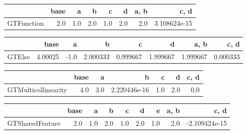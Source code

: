     \begin{tabular}{lrrrrrrr}
    \toprule
    {} &  base &    a &    b &    c &    d &  a, b &          c, d \\
    \midrule
    GTFunction &   2.0 &  1.0 &  2.0 &  1.0 &  2.0 &   2.0 &  3.108624e-15 \\
    \bottomrule
    \end{tabular}
    
    \begin{tabular}{lrrrrrrr}
    \toprule
    {} &     base &    a &         b &         c &         d &      a, b &      c, d \\
    \midrule
    GTElse &  4.00025 & -1.0 &  2.000333 &  0.999667 &  1.999667 &  1.999667 &  0.000333 \\
    \bottomrule
    \end{tabular}
    
    \begin{tabular}{lrrrrrr}
        \toprule
        {} &  base &    a &             b &    c &    d &  c, d \\
        \midrule
        GTMulticollinearity &   4.0 &  3.0 &  2.220446e-16 &  1.0 &  2.0 &   0.0 \\
        \bottomrule
        \end{tabular}

        \begin{tabular}{lrrrrrrrr}
            \toprule
            {} &  base &    a &    b &    c &    d &    e &  a, b &          c, d \\
            \midrule
            GTSharedFeature &   2.0 &  1.0 &  2.0 &  1.0 &  2.0 &  1.0 &   2.0 & -2.109424e-15 \\
            \bottomrule
        \end{tabular}


        




